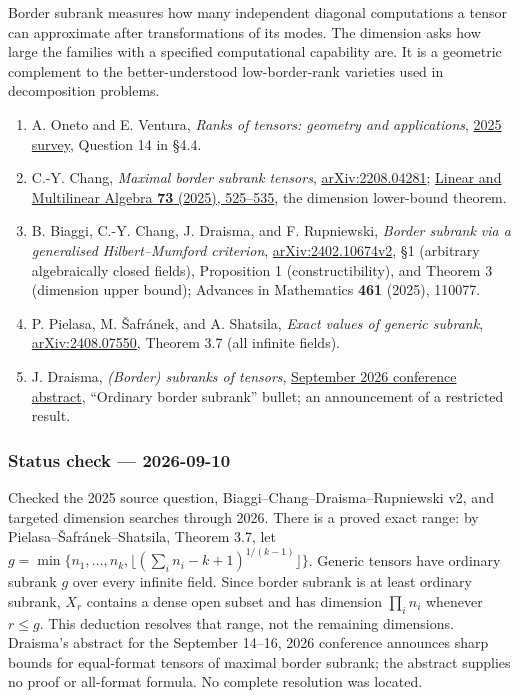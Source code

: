 \documentclass[11pt,a4paper]{article}
\makeatletter
\renewcommand{\subsection}{\Needspace{4\baselineskip}\@startsection{subsection}{2}{0pt}{9pt plus 1pt minus 1pt}{3pt}{\sffamily\bfseries\normalsize\color{ink}}}
\makeatother
\begin{document}
Border subrank measures how many independent diagonal computations a
tensor can approximate after transformations of its modes. The dimension
asks how large the families with a specified computational capability
are. It is a geometric complement to the better-understood
low-border-rank varieties used in decomposition problems.

\newpage
\subsection{References and status
check}\label{references-and-status-check}

\begin{enumerate}
\def\labelenumi{\arabic{enumi}.}
\item
  A. Oneto and E. Ventura, \emph{Ranks of tensors: geometry and
  applications}, \href{https://doi.org/10.1007/s40574-025-00472-9}{2025
  survey}, Question 14 in §4.4.
\item
  C.-Y. Chang, \emph{Maximal border subrank tensors},
  \href{https://arxiv.org/abs/2208.04281}{arXiv:2208.04281};
  \href{https://doi.org/10.1080/03081087.2024.2352456}{Linear and
  Multilinear Algebra \textbf{73} (2025), 525--535}, the dimension
  lower-bound theorem.
\item
  B. Biaggi, C.-Y. Chang, J. Draisma, and F. Rupniewski, \emph{Border
  subrank via a generalised Hilbert--Mumford criterion},
  \href{https://arxiv.org/html/2402.10674v2}{arXiv:2402.10674v2}, §1
  (arbitrary algebraically closed fields), Proposition 1
  (constructibility), and Theorem 3 (dimension upper bound); Advances in
  Mathematics \textbf{461} (2025), 110077.
\item
  P. Pielasa, M. Šafránek, and A. Shatsila, \emph{Exact values of
  generic subrank},
  \href{https://arxiv.org/pdf/2408.07550}{arXiv:2408.07550}, Theorem 3.7
  (all infinite fields).
\item
  J. Draisma, \emph{(Border) subranks of tensors},
  \href{https://www.combinatorial-synergies.de/activities/2026-09_AnnualConference/}{September
  2026 conference abstract}, ``Ordinary border subrank'' bullet; an
  announcement of a restricted result.
\end{enumerate}

\subsubsection{Status check ---
2026-09-10}\label{status-check-2026-09-10}

Checked the 2025 source question, Biaggi--Chang--Draisma--Rupniewski v2,
and targeted dimension searches through 2026. There is a proved exact
range: by Pielasa--Šafránek--Shatsila, Theorem 3.7, let
\(g=\min\{n_1,\ldots,n_k,\lfloor(\sum_i n_i-k+1)^{1/(k-1)}\rfloor\}\).
Generic tensors have ordinary subrank \(g\) over every infinite field.
Since border subrank is at least ordinary subrank, \(X_r\) contains a
dense open subset and has dimension \(\prod_i n_i\) whenever \(r\le g\).
This deduction resolves that range, not the remaining dimensions.
Draisma's abstract for the September 14--16, 2026 conference announces
sharp bounds for equal-format tensors of maximal border subrank; the
abstract supplies no proof or all-format formula. No complete resolution
was located.
\end{document}
